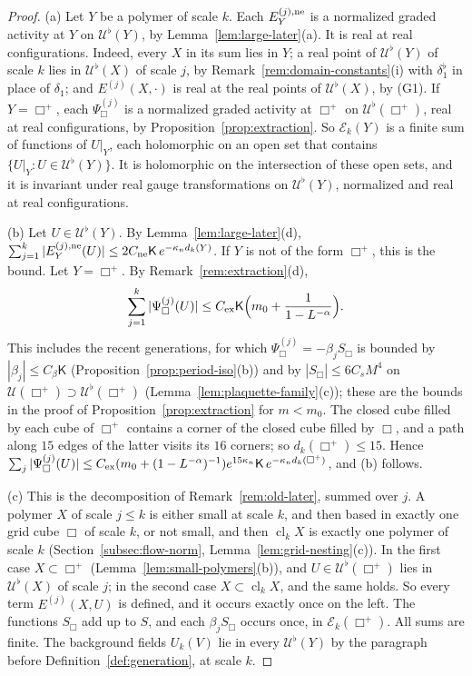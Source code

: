 \begin{proof}
(a) Let $Y$ be a polymer of scale $k$. Each $E^{(j),\rm ne}_Y$ is a normalized graded activity at $Y$ on $\mathcal U^\flat(Y)$, by Lemma~\ref{lem:large-later}(a). It is real at real configurations. Indeed, every $X$ in its sum lies in $Y$; a real point of $\mathcal U^\flat(Y)$ of scale $k$ lies in $\mathcal U^\flat(X)$ of scale $j$, by Remark~\ref{rem:domain-constants}(i) with $\delta_1^\flat$ in place of $\delta_1$; and $E^{(j)}(X,\cdot)$ is real at the real points of $\mathcal U^\flat(X)$, by (G1). If $Y=\Box^+$, each $\Psi^{(j)}_\Box$ is a normalized graded activity at $\Box^+$ on $\mathcal U^\flat(\Box^+)$, real at real configurations, by Proposition~\ref{prop:extraction}. So $\mathcal E_k(Y)$ is a finite sum of functions of $U|_Y$, each holomorphic on an open set that contains $\{U|_Y:U\in\mathcal U^\flat(Y)\}$. It is holomorphic on the intersection of these open sets, and it is invariant under real gauge transformations on $\mathcal U^\flat(Y)$, normalized and real at real configurations.

(b) Let $U\in\mathcal U^\flat(Y)$. By Lemma~\ref{lem:large-later}(d), $\sum_{j=1}^k|E^{(j),\rm ne}_Y(U)|\le2C_{\rm ne}\mathsf K\,e^{-\kappa_nd_k(Y)}$. If $Y$ is not of the form $\Box^+$, this is the bound. Let $Y=\Box^+$. By Remark~\ref{rem:extraction}(d),
\[
\sum_{j=1}^k|\Psi^{(j)}_\Box(U)|\le C_{\rm ex}\mathsf K\Big(m_0+\frac1{1-L^{-\alpha}}\Big).
\]
This includes the recent generations, for which $\Psi^{(j)}_\Box=-\beta_jS_\Box$ is bounded by $|\beta_j|\le C_\beta\mathsf K$ (Proposition~\ref{prop:period-iso}(b)) and by $|S_\Box|\le6C_sM^4$ on $\mathcal U(\Box^+)\supset\mathcal U^\flat(\Box^+)$ (Lemma~\ref{lem:plaquette-family}(c)); these are the bounds in the proof of Proposition~\ref{prop:extraction} for $m<m_0$. The closed cube filled by each cube of $\Box^+$ contains a corner of the closed cube filled by $\Box$, and a path along $15$ edges of the latter visits its $16$ corners; so $d_k(\Box^+)\le15$. Hence $\sum_j|\Psi^{(j)}_\Box(U)|\le C_{\rm ex}(m_0+(1-L^{-\alpha})^{-1})e^{15\kappa_n}\mathsf K\,e^{-\kappa_nd_k(\Box^+)}$, and (b) follows.

(c) This is the decomposition of Remark~\ref{rem:old-later}, summed over $j$. A polymer $X$ of scale $j\le k$ is either small at scale $k$, and then based in exactly one grid cube $\Box$ of scale $k$, or not small, and then $\operatorname{cl}_kX$ is exactly one polymer of scale $k$ (Section~\ref{subsec:flow-norm}, Lemma~\ref{lem:grid-nesting}(c)). In the first case $X\subset\Box^+$ (Lemma~\ref{lem:small-polymers}(b)), and $U\in\mathcal U^\flat(\Box^+)$ lies in $\mathcal U^\flat(X)$ of scale $j$; in the second case $X\subset\operatorname{cl}_kX$, and the same holds. So every term $E^{(j)}(X,U)$ is defined, and it occurs exactly once on the left. The functions $S_\Box$ add up to $S$, and each $\beta_jS_\Box$ occurs once, in $\mathcal E_k(\Box^+)$. All sums are finite. The background fields $U_k(V)$ lie in every $\mathcal U^\flat(Y)$ by the paragraph before Definition~\ref{def:generation}, at scale $k$.


\end{proof}
